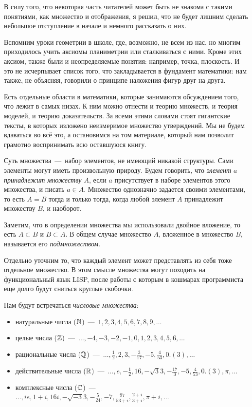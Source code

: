 	В силу того, что некоторая часть читателей может быть не знакома с такими понятиями, как множество и отображения, я решил, что не будет лишним сделать небольшое отступление в начале и немного рассказать о них.
	

	Вспомним уроки геометрии в школе, где, возможно, не всем из нас, но многим приходилось учить аксиомы планиметрии или сталкиваться с ними. Кроме этих аксиом, также были и неопределяемые понятия: например, точка, плоскость. И это не исчерпывает список того, что закладывается в фундамент математики: нам также, не объясняя, говорили о принципе наложения фигур друг на друга.
	
	Есть отдельные области в математики, которые занимаются обсуждением того, что лежит в самых низах. К ним можно отнести и теорию множеств, и теория моделей, и теорию доказательств. За всеми этими словами стоят гигантские тексты, в которых изложено неизмеримое множество утверждений. Мы не будем вдаваться во всё это, а остановимся на том материале, который нам позволит грамотно воспринимать всю оставшуюся книгу.
	
	Суть множества~---~набор элементов, не имеющий никакой структуры. Сами элементы могут иметь произвольную природу. Будем говорить, что \emph{элемент $a$ принадлежит множеству $A$}, если $a$ присутствует в наборе элементов этого множества, и писать $a \in A$. Множество однозначно задается своими элементами, то есть $A = B$ тогда и только тогда, когда любой элемент $A$ принадлежит множеству $B$, и наоборот.
	
	Заметим, что в определении множества мы использовали двойное вложение, то есть $A \subset B$ и $B \subset A$. В общем случае множество $A$, вложенное в множество $B$, называется его \emph{подмножеством}.
	
	Отдельно уточним то, что каждый элемент может представлять из себя тоже отдельное множество. В этом смысле множества могут походить на функциональный язык LISP, после работы с которым в кошмарах программиста еще долго будут сниться круглые скобочки.
	
	Нам будут встречаться \emph{числовые множества}:
\begin{itemize}
	\item натуральные числа ($\mathbb{N}$)~---~$1, 2, 3, 4, 5, 6, 7, 8, 9, \dots$
	\item целые числа ($\mathbb{Z}$)~---~$\dots, -4, -3, -2, -1, 0, 1, 2, 3, 4, 5, 6, \dots$
	\item рациональные числа ($\mathbb{Q}$)~---~$\dots,\frac{1}{2}, 2, 3, -\frac{3}{17}, -5, \frac{4}{53}, 0.(3), \dots$
	\item действительные числа ($\mathbb{R}$)~---~$\dots,e, -\frac{1}{2}, 16, -\sqrt{3}3, -\frac{17}{3}, -5, \frac{4}{53}, 0.(3), \pi, \dots$
	\item комплексные числа ($\mathbb{C}$)~---~$\dots, ie, 1 + i, 16i, -\sqrt{-3}3, -\frac{5}{24}, -7, \frac{97}{53 + i}, \frac{2+i}{3+i}, \pi + i, \dots$
\end{itemize}
	
